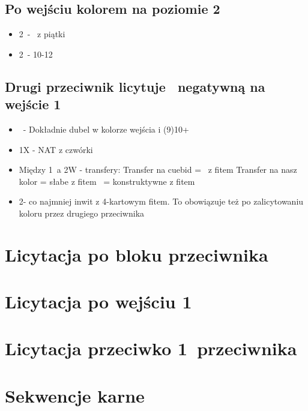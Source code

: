 \documentclass[12pt, a4paper]{article}
\begin{document}
\subsection{Po wejściu kolorem na poziomie 2}
\begin{itemize}
    \item 2\major\ - \fonce\ z piątki
    \item 2\nt\ - 10-12
\end{itemize}


\subsection{Drugi przeciwnik licytuje \dbl\ negatywną na wejście 1\major}
\begin{itemize}
    \item \rdbl\ - Dokładnie dubel w kolorze wejścia i (9)10+
    \item 1X - NAT z czwórki
    \item Między 1\nt\ a 2W - transfery:
    \subitem Transfer na cuebid = \inv\ z fitem
    \subitem Transfer na nasz kolor = słabe z fitem
    \major\ = konstruktywne z fitem
    \item 2\nt - co najmniej inwit z 4-kartowym fitem. To obowiązuje też po zalicytowaniu koloru 
    przez drugiego przeciwnika
\end{itemize}


\pagebreak

\section{Licytacja po bloku przeciwnika}

\pagebreak


\section{Licytacja po wejściu 1\ntx}

\pagebreak


\section{Licytacja przeciwko 1\ntx\ przeciwnika}

\pagebreak


\section{Sekwencje karne}
\end{document}
